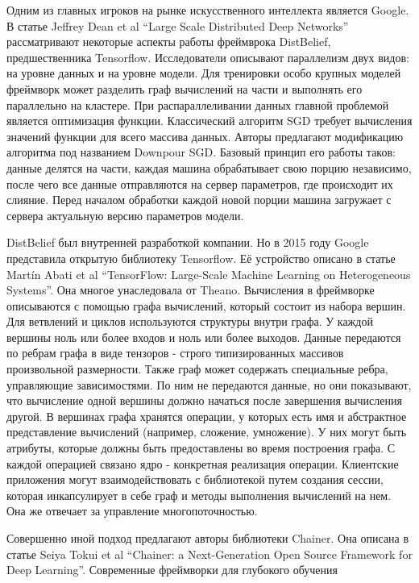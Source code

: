 \par
Одним из главных игроков на рынке искусственного интеллекта является Google.
В статье Jeffrey Dean et al “Large Scale Distributed Deep
Networks”\cite{Dean2012} рассматривают некоторые аспекты работы фреймврока
DistBelief, предшественника Tensorflow. Исследователи описывают параллелизм двух
видов: на уровне данных и на уровне модели. Для тренировки особо крупных моделей
фреймворк может разделить граф вычислений на части и выполнять его параллельно
на кластере. При распараллеливании данных главной проблемой является оптимизация
функции. Классический алгоритм SGD требует вычисления значений функции для всего
массива данных. Авторы предлагают модификацию алгоритма под названием Downpour
SGD. Базовый принцип его работы таков: данные делятся на части, каждая машина
обрабатывает свою порцию независимо, после чего все данные отправляются на
сервер параметров, где происходит их слияние. Перед началом обработки каждой
новой порции машина загружает с сервера актуальную версию параметров модели.
\par
DistBelief был внутренней разработкой компании. Но в 2015 году Google
представила открытую библиотеку Tensorflow. Её устройство описано в статье
Martín Abati et al “TensorFlow: Large-Scale Machine Learning on Heterogeneous
Systems”\cite{Abadi2016}. Она многое унаследовала от Theano. Вычисления в фреймворке
описываются с помощью графа вычислений, который состоит из набора вершин. Для
ветвлений и циклов используются структуры внутри графа. У каждой вершины ноль
или более входов и ноль или более выходов. Данные передаются по ребрам графа в
виде тензоров - строго типизированных массивов произвольной размерности. Также
граф может содержать специальные ребра, управляющие зависимостями. По ним не
передаются данные, но они показывают, что вычисление одной вершины должно
начаться после завершения вычисления другой. В вершинах графа хранятся операции,
у которых есть имя и абстрактное представление вычислений (например, сложение,
умножение). У них могут быть атрибуты, которые должны быть предоставлены во время
построения графа. С каждой операцией связано ядро - конкретная реализация
операции. Клиентские приложения могут взаимодействовать с библиотекой путем
создания сессии, которая инкапсулирует в себе граф и методы выполнения
вычислений на нем. Она же отвечает за управление многопоточностью.
\par
Совершенно иной подход предлагают авторы библиотеки Chainer. Она описана в
статье Seiya Tokui et al “Chainer: a Next-Generation Open Source Framework for
Deep Learning”\cite{Tokui2015}. Современные фреймворки для глубокого обучения

